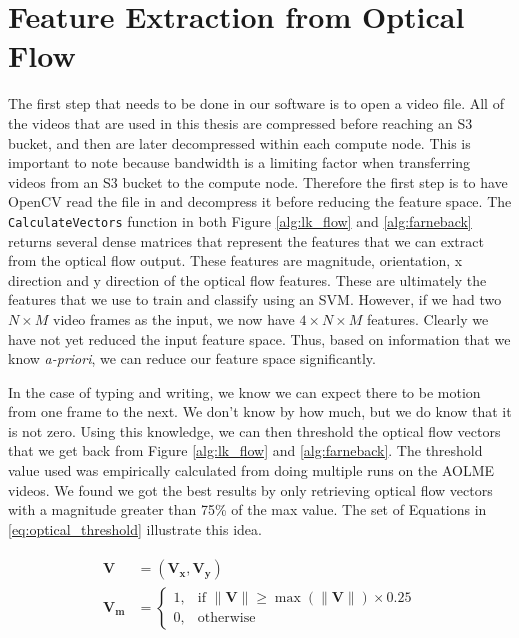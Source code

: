 \section{\label{section:feature_extraction}Feature Extraction from Optical Flow}
The first step that needs to be done in our software is to open a video file.
All of the videos that are used in this thesis are compressed before reaching an
S3 bucket, and then are later decompressed  within each compute node. This is
important to note because bandwidth is a limiting factor when transferring
videos from an S3 bucket to the compute node.  Therefore the first step is to
have OpenCV read the file in and decompress it before  reducing the feature
space. The \texttt{CalculateVectors} function in both Figure \ref{alg:lk_flow}
and \ref{alg:farneback} returns several dense matrices that represent the
features that we can extract from the optical flow output. These features are
magnitude, orientation, x direction and y direction of the optical flow
features. These are ultimately the features that we use to train and classify
using an SVM. However, if we had two $N \times M$ video frames as the input, we
now have $4 \times N \times M$ features. Clearly we have not yet reduced the
input feature space. Thus, based on information that we know \textit{a-priori},
we can reduce our feature space significantly.

In the case of typing and writing, we know we can expect there to be motion from
one frame to the next. We don't know by how much, but we do know that it is not
zero. Using this knowledge, we can then threshold the optical flow vectors that
we get back from Figure \ref{alg:lk_flow} and \ref{alg:farneback}. The
threshold value used was empirically calculated from doing multiple runs on the
AOLME videos. We found we got the best results by only retrieving
optical flow vectors with a magnitude greater than 75\% of the max value. The set
of Equations in \ref{eq:optical_threshold} illustrate this idea.

\begin{align}
  \begin{split}
  \mathbf{V} &= (\mathbf{V_x}, \mathbf{V_y}) \\
  \mathbf{V_m} &=
  \begin{cases}
    1, & \text{if } \|\mathbf{V}\| \geq \max( \|\mathbf{V}\|) \times 0.25 \\
    0, & \text{otherwise}
  \end{cases}
  \end{split}
  \label{eq:optical_threshold}
\end{align}

